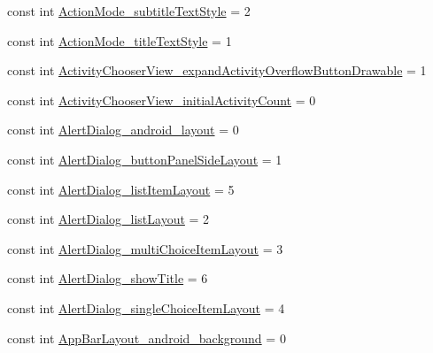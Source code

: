 \begin{DoxyCompactItemize}
\item 
const int \mbox{\hyperlink{class_f_w_p_s___app_1_1_droid_1_1_resource_1_1_styleable_abdb4f27051ed9da0e0874ac576e89f97}{Action\+Mode\+\_\+subtitle\+Text\+Style}} = 2
\item 
const int \mbox{\hyperlink{class_f_w_p_s___app_1_1_droid_1_1_resource_1_1_styleable_a391113b48c7709f73674aa82b26e34cc}{Action\+Mode\+\_\+title\+Text\+Style}} = 1
\item 
const int \mbox{\hyperlink{class_f_w_p_s___app_1_1_droid_1_1_resource_1_1_styleable_a57e8dce5941422845d25854f25831e96}{Activity\+Chooser\+View\+\_\+expand\+Activity\+Overflow\+Button\+Drawable}} = 1
\item 
const int \mbox{\hyperlink{class_f_w_p_s___app_1_1_droid_1_1_resource_1_1_styleable_a7e66cf332bb6e7f880c2240205a3cdca}{Activity\+Chooser\+View\+\_\+initial\+Activity\+Count}} = 0
\item 
const int \mbox{\hyperlink{class_f_w_p_s___app_1_1_droid_1_1_resource_1_1_styleable_a5833031c65b0dcd4c0daf19aebacf667}{Alert\+Dialog\+\_\+android\+\_\+layout}} = 0
\item 
const int \mbox{\hyperlink{class_f_w_p_s___app_1_1_droid_1_1_resource_1_1_styleable_acd8e34d1dd1fa920845efd77d764367f}{Alert\+Dialog\+\_\+button\+Panel\+Side\+Layout}} = 1
\item 
const int \mbox{\hyperlink{class_f_w_p_s___app_1_1_droid_1_1_resource_1_1_styleable_a92c6a5cc552d44203fbd40d4616ce5b7}{Alert\+Dialog\+\_\+list\+Item\+Layout}} = 5
\item 
const int \mbox{\hyperlink{class_f_w_p_s___app_1_1_droid_1_1_resource_1_1_styleable_af4fba25b86afceff4e5fbf26dedeac58}{Alert\+Dialog\+\_\+list\+Layout}} = 2
\item 
const int \mbox{\hyperlink{class_f_w_p_s___app_1_1_droid_1_1_resource_1_1_styleable_aef596554c3dc1ee2fea4f74ca92b13ab}{Alert\+Dialog\+\_\+multi\+Choice\+Item\+Layout}} = 3
\item 
const int \mbox{\hyperlink{class_f_w_p_s___app_1_1_droid_1_1_resource_1_1_styleable_a6b9feea012c89854972d7d6f37ad36d5}{Alert\+Dialog\+\_\+show\+Title}} = 6
\item 
const int \mbox{\hyperlink{class_f_w_p_s___app_1_1_droid_1_1_resource_1_1_styleable_a425dba129ab115fe6745ec80722affea}{Alert\+Dialog\+\_\+single\+Choice\+Item\+Layout}} = 4
\item 
const int \mbox{\hyperlink{class_f_w_p_s___app_1_1_droid_1_1_resource_1_1_styleable_aa2ca3bac121d413709e9b4d51ae28c4a}{App\+Bar\+Layout\+\_\+android\+\_\+background}} = 0
\item 

\end{DoxyCompactItemize}
